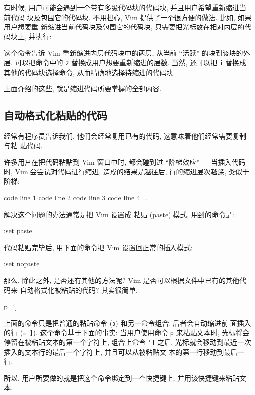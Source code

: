 有时候, 用户可能会遇到一个带有多级代码块的代码块, 并且用户希望重新缩进当前代码
块及包围它的代码块. 不用担心, Vim 提供了一个很方便的做法. 比如, 如果用户想要重
新缩进当前代码块及包围它的代码块, 只需要把光标放在相对内层的代码块上, 并执行:
\begin{vimcode}
=2i{
\end{vimcode}
这个命令告诉 Vim 重新缩进内层代码块中的两层, 从当前 ``活跃'' 的块到该块的外层.
可以把命令中的 \texttt{2} 替换成用户想要重新缩进的层数. 当然, 还可以把
\texttt{i} 替换成其他的代码块选择命令, 从而精确地选择待缩进的代码块.

上面介绍的这些, 就是缩进代码所要掌握的全部内容.

\subsection{自动格式化粘贴的代码}
\label{subsec:auto_format_pasted_code}

经常有程序员告诉我们, 他们会经常复用已有的代码, 这意味着他们经常需要复制与粘
贴代码.

许多用户在把代码粘贴到 Vim 窗口中时, 都会碰到过 ``阶梯效应'' --- 当插入代码时,
Vim 会尝试对代码进行缩进, 造成的结果是越往后, 行的缩进层次越深, 类似于阶梯:
\begin{vimcode}
code line 1
    code line 2
        code line 3
            code line 4
               ...
\end{vimcode}
解决这个问题的办法通常是把 Vim 设置成 粘贴 (paste) 模式, 用到的命令是:
\begin{vimcode}
:set paste
\end{vimcode}
代码粘贴完毕后, 用下面的命令把 Vim 设置回正常的插入模式:
\begin{vimcode}
:set nopaste
\end{vimcode}

那么, 除此之外, 是否还有其他的方法呢? Vim 是否可以根据文件中已有的其他代码来
自动格式化被粘贴的代码? 其实很简单.
\begin{vimcode}
p=`]
\end{vimcode}
上面的命令只是把普通的粘贴命令 (\texttt{p}) 和另一命令组合, 后者会自动缩进前
面插入的行 (\texttt{=`]}). 这个命令基于下面的事实: 当用户使用命令 \texttt{p}
来粘贴文本时, 光标将会停留在被粘贴文本的第一个字符上, 组合上命令 \texttt{`]}
之后, 光标就会移动到最近一次插入的文本行的最后一个字符上, 并且可以从被粘贴文
本的第一行移动到最后一行.

所以, 用户所要做的就是把这个命令绑定到一个快捷键上, 并用该快捷键来粘贴文本.

